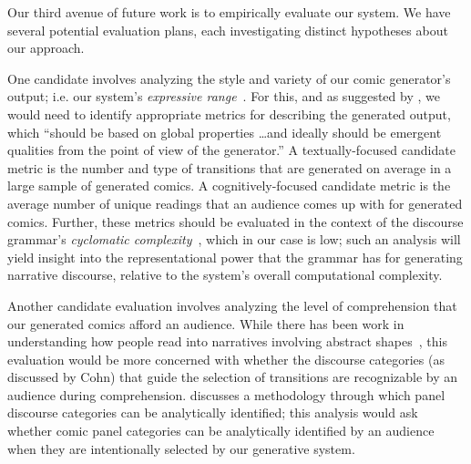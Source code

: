 Our third avenue of future work is to empirically evaluate our system.  We
have several potential evaluation plans, each investigating distinct
hypotheses about our approach.

One candidate involves analyzing the style and variety of our
comic generator's output; i.e. our system's 
\emph{expressive range}~\cite{smith2010analyzing}. For this, and as
suggested by \citeauthor{smith2010analyzing}, we would need to identify
appropriate metrics for describing the generated output, which ``should be
based on global properties \ldots and ideally should be emergent qualities
from the point of view of the generator.'' A textually-focused candidate 
metric is the number and type of transitions that are generated on average
in a large sample of generated comics. A cognitively-focused candidate
metric is the average number of unique readings that an audience comes up
with for generated comics. Further, these metrics should be evaluated in
the context of the discourse grammar's \emph{cyclomatic
complexity}~\cite{mccabe1976complexity}, which in our case is low; such an
analysis will yield insight into the representational power that the
grammar has for generating narrative discourse, relative to the system's
overall computational complexity.

Another candidate evaluation involves analyzing the level of comprehension
that our generated comics afford an audience. While there has been work in
understanding how people read into narratives involving abstract
shapes~, this evaluation would be more 
concerned with whether the discourse categories (as discussed by Cohn) that
guide the selection of transitions are recognizable by an audience during
comprehension.  discusses a methodology through 
which panel discourse categories can be analytically identified; this analysis
would ask whether comic panel categories can be analytically identified by
an audience when they are intentionally selected by our generative system.







